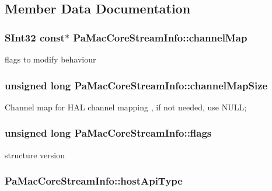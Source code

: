 \subsection{Member Data Documentation}
\hypertarget{struct_pa_mac_core_stream_info_a2339c27ad6b84924be79bf73e4402bd4}{
\subsubsection[{channel\+Map}]{\setlength{\rightskip}{0pt plus 5cm}S\+Int32 const$\ast$ Pa\+Mac\+Core\+Stream\+Info\+::channel\+Map}}\label{struct_pa_mac_core_stream_info_a2339c27ad6b84924be79bf73e4402bd4}
flags to modify behaviour \hypertarget{struct_pa_mac_core_stream_info_aab3ecc35ef267ecebc8874d399061b87}{
\subsubsection[{channel\+Map\+Size}]{\setlength{\rightskip}{0pt plus 5cm}unsigned long Pa\+Mac\+Core\+Stream\+Info\+::channel\+Map\+Size}}\label{struct_pa_mac_core_stream_info_aab3ecc35ef267ecebc8874d399061b87}
Channel map for H\+A\+L channel mapping , if not needed, use N\+U\+L\+L; \hypertarget{struct_pa_mac_core_stream_info_afe018712e7c57198176ed72cb18f9938}{
\subsubsection[{flags}]{\setlength{\rightskip}{0pt plus 5cm}unsigned long Pa\+Mac\+Core\+Stream\+Info\+::flags}}\label{struct_pa_mac_core_stream_info_afe018712e7c57198176ed72cb18f9938}
structure version \hypertarget{struct_pa_mac_core_stream_info_a63f4110b767bfbf2fa09b88f3252d91e}{
\subsubsection[{host\+Api\+Type}]{ Pa\+Mac\+Core\+Stream\+Info\+::host\+Api\+Type}}\label{struct_pa_mac_core_stream_info_a63f4110b767bfbf2fa09b88f3252d91e}
